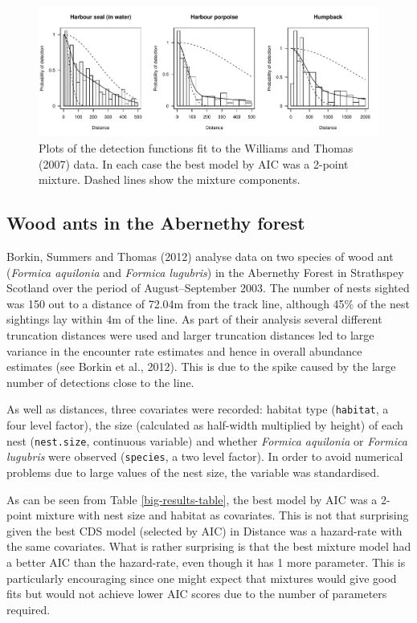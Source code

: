\documentclass[useAMS,referee]{biom}
\begin{document}
\begin{figure}
\centering
\includegraphics[width=\textwidth]{analyses/williamsplots.pdf}
\caption{Plots of the detection functions fit to the Williams and Thomas (2007) data. In each case the best model by AIC was a 2-point mixture. Dashed lines show the mixture components.}
\label{williams-detfcts}
\end{figure}


\subsection{Wood ants in the Abernethy forest}

Borkin, Summers and Thomas (2012) analyse data on two species of wood ant (\textit{Formica aquilonia} and \textit{Formica lugubris}) in the Abernethy Forest in Strathspey Scotland over the period of August--September 2003. The number of nests sighted was 150 out to a distance of 72.04m from the track line, although 45\% of the nest sightings lay within 4m of the line. As part of their analysis several different truncation distances were used and larger truncation distances led to large variance in the encounter rate estimates and hence in overall abundance estimates (see Borkin et al., 2012). This is due to the spike caused by the large number of detections close to the line.

As well as distances, three covariates were recorded: habitat type (\texttt{habitat}, a four level factor), the size (calculated as half-width multiplied by height) of each nest (\texttt{nest.size}, continuous variable) and whether \textit{Formica aquilonia} or \textit{Formica lugubris} were observed (\texttt{species}, a two level factor). In order to avoid numerical problems due to large values of the nest size, the variable was standardised.

As can be seen from Table \ref{big-results-table}, the best model by AIC was a 2-point mixture with nest size and habitat as covariates. This is not that surprising given the best CDS model (selected by AIC) in Distance was a hazard-rate with the same covariates. What is rather surprising is that the best mixture model had a better AIC than the hazard-rate, even though it has 1 more parameter. This is particularly encouraging since one might expect that mixtures would give good fits but would not achieve lower AIC scores due to the number of parameters required.
\end{document}
